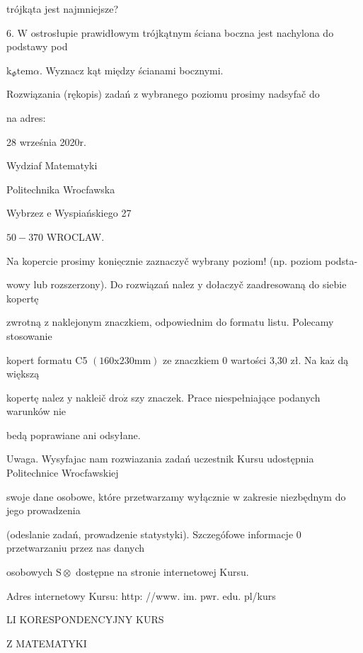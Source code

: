 \documentclass[a4paper,12pt]{article}
\begin{document}
trójkąta jest najmniejsze?

6. $\mathrm{W}$ ostrosłupie prawidłowym trójkątnym ściana boczna jest nachylona do podstawy pod

$\mathrm{k}_{\Phi}\mathrm{t}\mathrm{e}\mathrm{m}\alpha$. Wyznacz kąt między ścianami bocznymi.

Rozwiązania (rękopis) zadań z wybranego poziomu prosimy nadsyfač do

na adres:

28 września 2020r.

Wydziaf Matematyki

Politechnika Wrocfawska

Wybrzez $\mathrm{e}$ Wyspiańskiego 27

$50-370$ WROCLAW.

Na kopercie prosimy $\underline{\mathrm{k}\mathrm{o}\mathrm{n}\mathrm{i}\mathrm{e}\mathrm{c}\mathrm{z}\mathrm{n}\mathrm{i}\mathrm{e}}$ zaznaczyč wybrany poziom! (np. poziom podsta-

wowy lub rozszerzony). Do rozwiązań nalez $\mathrm{y}$ dołaczyč zaadresowaną do siebie kopertę

zwrotną $\mathrm{z}$ naklejonym znaczkiem, odpowiednim do formatu listu. Polecamy stosowanie

kopert formatu C5 $(160\mathrm{x}230\mathrm{m}\mathrm{m})$ ze znaczkiem $0$ wartości 3,30 zł. Na $\mathrm{k}\mathrm{a}\dot{\mathrm{z}}$ dą większą

kopertę nalez $\mathrm{y}$ nakleič $\mathrm{d}\mathrm{r}\mathrm{o}\dot{\mathrm{z}}$ szy znaczek. Prace niespełniające podanych warunków nie

bedą poprawiane ani odsyłane.

Uwaga. Wysyfajac nam rozwiazania zadań uczestnik Kursu udostępnia Politechnice Wrocfawskiej

swoje dane osobowe, które przetwarzamy wyłącznie $\mathrm{w}$ zakresie niezbędnym do jego prowadzenia

(odeslanie zadań, prowadzenie statystyki). Szczegófowe informacje $0$ przetwarzaniu przez nas danych

osobowych $\mathrm{S}\otimes$ dostępne na stronie internetowej Kursu.

Adres internetowy Kursu: http: //www. im. pwr. edu. pl/kurs







LI KORESPONDENCYJNY KURS

Z MATEMATYKI
\end{document}
